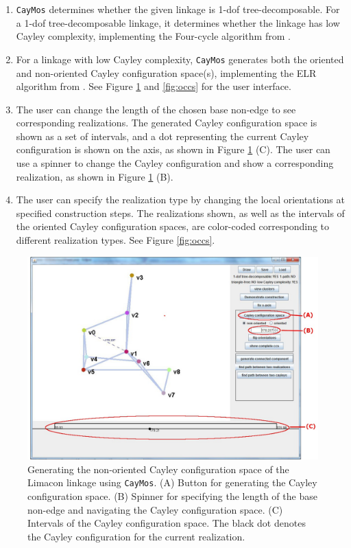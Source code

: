 \documentclass[10pt]{article}
\begin{document}
\begin{enumerate}


\item \texttt{CayMos} determines whether the given linkage is 1-dof tree-decomposable. 
For a 1-dof tree-decomposable linkage, 
it determines whether the linkage has low Cayley complexity, implementing the Four-cycle algorithm from \cite{Sitharam2011b}. 

\item For a linkage with low Cayley complexity, \texttt{CayMos} generates both the oriented and non-oriented Cayley configuration space(s), 
implementing the ELR algorithm from \cite{Sitharam2011a}.
See Figure \ref{fig:ccs} and \ref{fig:occs} for the user interface. 


\item The user can change the length of the chosen base non-edge to see corresponding realizations.
The generated Cayley configuration space is shown as a set of intervals, 
and a dot representing the current Cayley configuration is shown on the axis, 
as shown in Figure \ref{fig:ccs} (C).
The user can use a spinner to change the Cayley configuration and show 
 a corresponding realization, 
 as shown in Figure \ref{fig:ccs} (B). %

\item The user can specify the realization type by changing the local orientations at specified construction steps.
The realizations shown, as well as the intervals of the oriented Cayley configuration spaces, are color-coded corresponding to different realization types.
See Figure \ref{fig:occs}. 

\end{enumerate}

\begin{figure}[hbtp]
\begin{center}
\includegraphics[width=0.65\linewidth]{img/ccs}
\end{center}
\caption{Generating the non-oriented Cayley configuration space of the Limacon linkage using \texttt{CayMos}. 
(A) Button for generating the Cayley configuration space. 
(B) Spinner for specifying the length of the base non-edge and navigating the Cayley configuration space. 
(C) Intervals of the Cayley configuration space. The black dot denotes the Cayley configuration for the current realization. }
\label{fig:ccs}
\end{figure}
\end{document}
